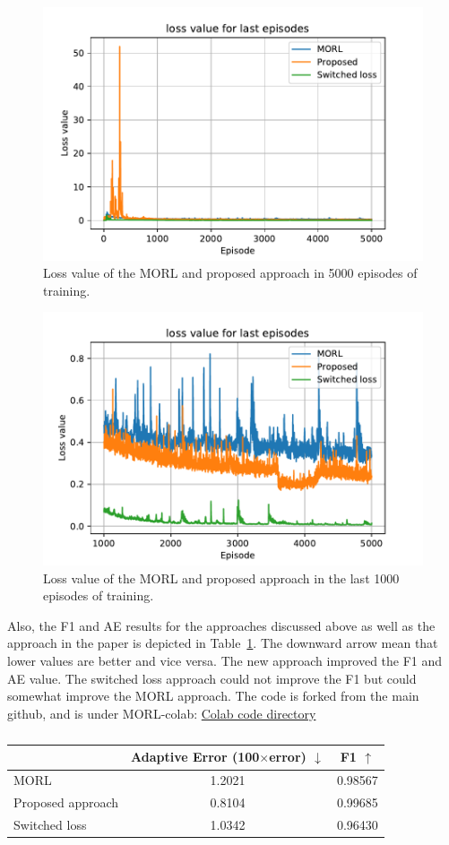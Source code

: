 \documentclass[11pt,onecolumn]{IEEEtran}
\begin{document}
\begin{figure}[htbp]
    \centering
    \includegraphics[width=0.7\linewidth]{full_loss.pdf}
    \caption{Loss value of the MORL and proposed approach in 5000 episodes of training.}
    \label{fig:full_loss}
\end{figure}

\begin{figure}[htbp]
    \centering
    \includegraphics[width=0.7\linewidth]{partial_loss.pdf}
    \caption{Loss value of the MORL and proposed approach in the last 1000 episodes of training.}
    \label{fig:partial_loss}
\end{figure}
Also, the F1 and AE results for the approaches discussed above as well as the approach in the paper is depicted in Table~\ref{tab:eval}. The downward arrow mean that lower values are better and vice versa. The new approach improved the F1 and AE value. The switched loss approach could not improve the F1 but could somewhat improve the MORL approach. The code is forked from the main github, and is under MORL-colab: \href{https://github.com/thisishale/MORL}{Colab code directory}



\begin{table}[htbp]
\centering
\caption{}
\begin{tabular}[t]{lcc}
\toprule
& Adaptive Error (100$\times$error) $\downarrow$  & F1 $\uparrow$ \\
\midrule
 MORL & 1.2021 & 0.98567  \\ 
 Proposed approach & 0.8104 & 0.99685 \\ 
 Switched loss & 1.0342 & 0.96430 \\ 
\bottomrule
\end{tabular}
\label{tab:eval}
\end{table}%
\medskip
\clearpage


\end{document}
